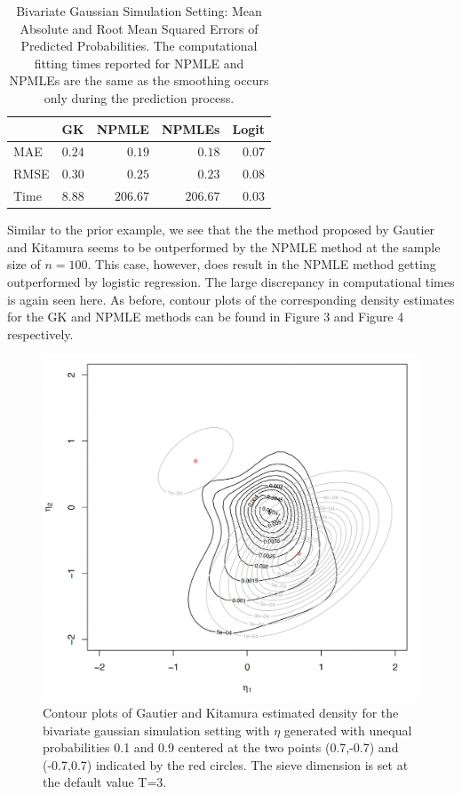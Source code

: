 \documentclass[11pt]{article}
\begin{document}
\begin{table}[!htbp]
\begin{center}
\begin{tabular}{lrrrr}
\hline\hline
\multicolumn{1}{l}{}&\multicolumn{1}{c}{GK}&\multicolumn{1}{c}{NPMLE}&\multicolumn{1}{c}{NPMLEs}&\multicolumn{1}{c}{Logit}\tabularnewline
\hline
MAE&$0.24$&$  0.19$&$  0.18$&$0.07$\tabularnewline
RMSE&$0.30$&$  0.25$&$  0.23$&$0.08$\tabularnewline
Time&$8.88$&$206.67$&$206.67$&$0.03$\tabularnewline
\hline
\end{tabular}
\caption{Bivariate Gaussian Simulation Setting:  
Mean Absolute and Root Mean Squared Errors of Predicted Probabilities. 
The computational fitting times reported for NPMLE and NPMLEs are the same as the smoothing occurs only during the prediction process.}
\label{tab.sim1a}
\end{center}
\end{table}


Similar to the prior example, we see that the the method proposed by Gautier and Kitamura seems to be outperformed by the NPMLE method at the sample size of $n = 100$. This case, however, does result in the NPMLE method getting outperformed by logistic regression. The large discrepancy in computational times is again seen here. As before, contour plots of the corresponding density estimates for the GK and NPMLE methods can be found in Figure 3 and Figure 4 respectively. 

\begin{figure}[H]
\centering
\includegraphics[scale = 0.5]{GK1_new.png}
\caption{Contour plots of Gautier and Kitamura estimated density for the bivariate gaussian simulation setting with $\eta$ generated with unequal probabilities 0.1 and 0.9 centered at the two points  (0.7,-0.7) and (-0.7,0.7) indicated by the red circles. The sieve dimension is set at the default value T=3.}
\end{figure}
\end{document}
